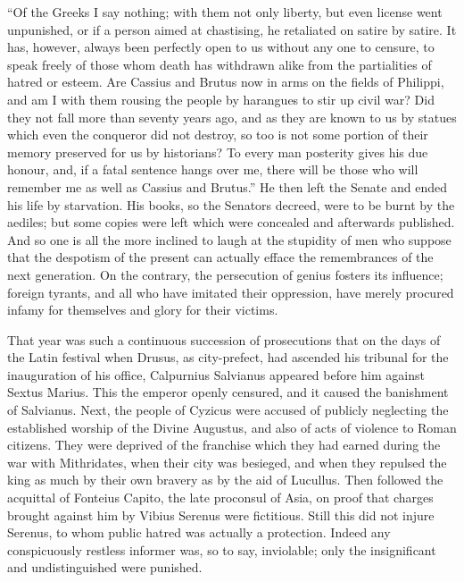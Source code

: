 ``Of the Greeks I say nothing; with them not only liberty, but even license went unpunished, or if a person aimed at chastising, he retaliated on satire by satire. It has, however, always been perfectly open to us without any one to censure, to speak freely of those whom death has withdrawn alike from the partialities of hatred or esteem. Are Cassius and Brutus now in arms on the fields of Philippi, and am I with them rousing the people by harangues to stir up civil war? Did they not fall more than seventy years ago, and as they are known to us by statues which even the conqueror did not destroy, so too is not some portion of their memory preserved for us by historians? To every man posterity gives his due honour, and, if a fatal sentence hangs over me, there will be those who will remember me as well as Cassius and Brutus.'' He then left the Senate and ended his life by starvation. His books, so the Senators decreed, were to be burnt by the aediles; but some copies were left which were concealed and afterwards published. And so one is all the more inclined to laugh at the stupidity of men who suppose that the despotism of the present can actually efface the remembrances of the next generation. On the contrary, the persecution of genius fosters its influence; foreign tyrants, and all who have imitated their oppression, have merely procured infamy for themselves and glory for their victims.


That year was such a continuous succession of prosecutions that on the days of the Latin festival when Drusus, as city-prefect, had ascended his tribunal for the inauguration of his office, Calpurnius Salvianus appeared before him against Sextus Marius. This the emperor openly censured, and it caused the banishment of Salvianus. Next, the people of Cyzicus were accused of publicly neglecting the established worship of the Divine Augustus, and also of acts of violence to Roman citizens. They were deprived of the franchise which they had earned during the war with Mithridates, when their city was besieged, and when they repulsed the king as much by their own bravery as by the aid of Lucullus. Then followed the acquittal of Fonteius Capito, the late proconsul of Asia, on proof that charges brought against him by Vibius Serenus were fictitious. Still this did not injure Serenus, to whom public hatred was actually a protection. Indeed any conspicuously restless informer was, so to say, inviolable; only the insignificant and undistinguished were punished.

